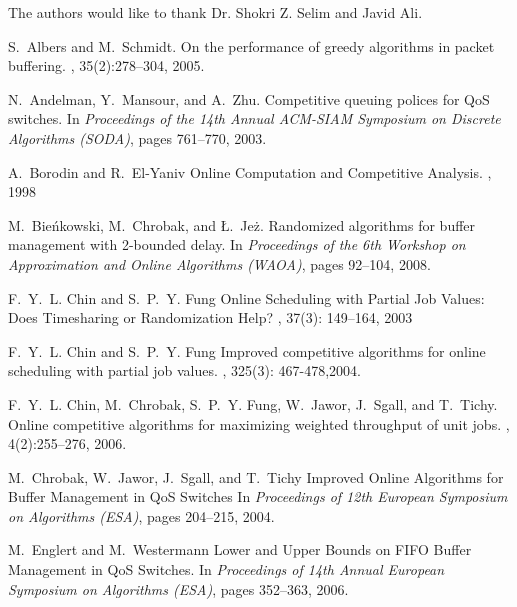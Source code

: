 \documentclass[oribibl]{llncs}
\begin{document}
The authors would like to thank Dr. Shokri Z. Selim and Javid Ali.



\begin{thebibliography}{1}

S.~Albers and M.~Schmidt.
\newblock On the performance of greedy algorithms in packet buffering.
, 35(2):278--304, 2005.

N.~Andelman, Y.~Mansour, and A.~Zhu.
\newblock Competitive queuing polices for {Q}o{S} switches.
\newblock In {\em Proceedings of the 14th Annual ACM-SIAM Symposium on Discrete
  Algorithms (SODA)}, pages 761--770, 2003.
  
  A.~Borodin and R.~El-Yaniv
  \newblock Online Computation and Competitive Analysis.
  , 1998

M.~Bie{\'n}kowski, M.~Chrobak, and {\L}.~Je{\.z}.
\newblock Randomized algorithms for buffer management with 2-bounded delay.
\newblock In {\em Proceedings of the 6th Workshop on Approximation and Online
  Algorithms (WAOA)}, pages 92--104, 2008.
  
F.~Y.~L. Chin and S.~P.~Y. Fung
\newblock Online Scheduling with Partial Job Values: Does Timesharing or Randomization Help?
, 37(3): 149--164, 2003
  
F.~Y.~L. Chin and S.~P.~Y. Fung
\newblock Improved competitive algorithms for online scheduling with partial job values.
, 325(3): 467-478,2004.

F.~Y.~L. Chin, M.~Chrobak, S.~P.~Y. Fung, W.~Jawor, J.~Sgall, and T.~Tichy.
\newblock Online competitive algorithms for maximizing weighted throughput of
  unit jobs.
, 4(2):255--276, 2006.

M.~Chrobak, W.~Jawor, J.~Sgall, and T.~Tichy
\newblock Improved Online Algorithms for Buffer Management in QoS Switches
\newblock In {\em Proceedings of 12th European
Symposium on Algorithms (ESA)}, pages 204--215, 2004.

M.~Englert and M.~Westermann
\newblock Lower and Upper Bounds on FIFO Buffer Management in QoS Switches.
\newblock In {\em Proceedings of 14th Annual European Symposium on Algorithms (ESA)}, pages 352--363, 2006.


\end{thebibliography}
\end{document}
